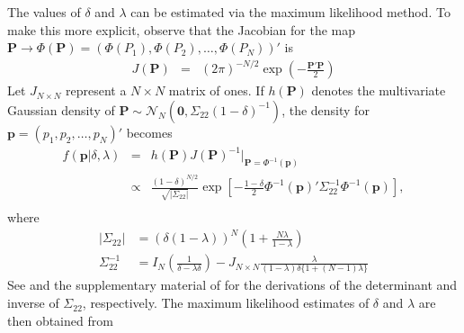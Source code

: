 \documentclass[11pt]{article}
\theoremstyle{definition}
\theoremstyle{definition}
\begin{document}
The values of $\delta$ and $\lambda$ can be estimated via the maximum likelihood method. To make this more explicit, observe that the Jacobian for the map $\boldsymbol{P} \to \Phi\left(\boldsymbol{P}\right) = (\Phi(P_1), \Phi(P_2), \dots, \Phi(P_N))'$ is
\begin{eqnarray*}
J(\boldsymbol{P}) &=& (2\pi)^{-N/2} \exp \left( - \frac{\boldsymbol{P}' \boldsymbol{P}}{2}   \right) 
\end{eqnarray*}
%
Let $J_{N \times N}$ represent a $N\times N$ matrix of ones. If $h(\boldsymbol{P})$ denotes the multivariate Gaussian density of $\boldsymbol{P} \sim \mathcal{N}_N\left(\boldsymbol{0}, \Sigma_{22} (1-\delta)^{-1}\right)$,
the density for  $\boldsymbol{p} = (p_1, p_2, \dots, p_N)'$ becomes
\begin{eqnarray*}
 f\left(\boldsymbol{p} | \delta, \lambda \right) &=& h(\boldsymbol{P}) J(\boldsymbol{P})^{-1} \bigg|_{\boldsymbol{P} = \Phi^{-1}(\boldsymbol{p})}\\
&\propto&\frac{(1-\delta)^{N/2}}{\sqrt{ \left|\Sigma_{22}\right|}} \exp\left[ -\frac{1-\delta}{2} \Phi^{-1}(\boldsymbol{p})' \Sigma_{22}^{-1}  \Phi^{-1}(\boldsymbol{p})  \right],\\
\end{eqnarray*}
where
\begin{align*}
\left| \Sigma_{22}\right| &= (\delta(1- \lambda))^N \left(1+\frac{N \lambda}{1 - \lambda} \right) \nonumber\\
\Sigma_{22}^{-1} &= I_N \left(\frac{1}{\delta-\lambda\delta} \right) - J_{N \times N} \frac{\lambda}{(1-\lambda)\delta\{1+(N-1) \lambda\}} 
\end{align*}
See \citet{rao2009linear} and the supplementary material of \citet{dobbin2005sample} for the derivations of the determinant and inverse of $\Sigma_{22}$, respectively. The maximum likelihood estimates of $\delta$ and $\lambda$ are then obtained from
\end{document}
